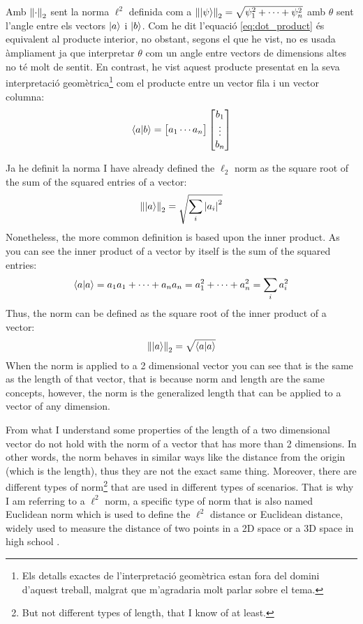 Amb $\norm{\cdot}_2$ sent la norma $\ell^2$  definida com a $\norm{\ket{\psi}}_2 = \sqrt{\psi_{1}^2 + \cdots + \psi_{n}^2}$ amb $\theta$ sent l'angle entre els vectors $\ket{a}$ i $\ket{b}$. Com he dit l'equació \eqref{eq:dot_product} és equivalent al producte interior, no obstant, segons el que he vist, no es usada àmpliament ja que interpretar $\theta$ com un angle entre vectors de dimensions altes no té molt de sentit. En contrast, he vist aquest producte presentat en la seva interpretació geomètrica\footnote{Els detalls exactes de l'interpretació geomètrica estan fora del domini d'aquest treball, malgrat que m'agradaria molt parlar sobre el tema.} com el producte entre un vector fila i un vector columna: 
$$
\bra{a}\ket{b} = \begin{bmatrix}a_1  \cdots  a_n \end{bmatrix} \begin{bmatrix} b_{1} \\ \vdots \\ b_{n} \end{bmatrix}
$$

Ja he definit la norma 
I have already defined the $\ell_2$ norm as the square root of the sum of the squared entries of a vector: 
$$
\norm{\ket{a}}_2 = \sqrt{\sum_{i} \abs{a_{i}}^2}
$$
Nonetheless, the more common definition is based upon the inner product. As you can see the inner product of a vector by itself is the sum of the squared entries: 
$$
\bra{a}\ket{a} = a_1 a_1 + \cdots + a_n a_n = a_1^2 + \cdots +  a_n^2 \\= \sum_{i} a_i^2
$$
Thus, the norm can be defined as the square root of the inner product of a vector:
\begin{equation}
\norm{\ket{a}}_2 = \sqrt{\bra{a}\ket{a}}
\label{eq:norm}
\end{equation}
When the norm is applied to a 2 dimensional vector you can see that is the same as the length of that vector, that is because norm and length are the same concepts, however, the norm is the generalized length that can be applied to a vector of any dimension. 


From what I understand some properties of the length of a two dimensional vector do not hold with the norm of a vector that has more than 2 dimensions. In other words, the norm behaves in similar ways like the distance from the origin (which is the length), thus they are not the exact same thing. Moreover, there are different types of norm\footnote{But not different types of length, that I know of at least.} that are used in different types of scenarios. That is why I am referring to a $\ell^2$ norm, a specific type of norm that is also named Euclidean norm which is used to define the $\ell^2$ distance or Euclidean distance, widely used to measure the distance of two points in a 2D space or a 3D space in high school \cite{wolfram:2norm}.

